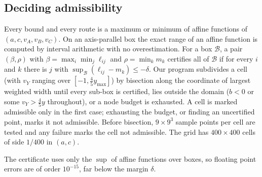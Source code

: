 \documentclass[11pt]{amsart}
\theoremstyle{definition}
\theoremstyle{remark}
\begin{document}
\subsection*{Deciding admissibility}
Every bound and every route is a maximum or minimum of affine functions of $(a,c,v_A,v_B,v_C)$. On an axis-parallel box the exact range of an affine function is computed by interval arithmetic with no overestimation. For a box $\mathcal B$, a pair $(\beta,\rho)$ with $\beta=\max_i\min_j \ell_{ij}$ and $\rho=\min_k m_k$ certifies all of $\mathcal B$ if for every $i$ and $k$ there is $j$ with $\sup_{\mathcal B}(\ell_{ij}-m_k)\le-\delta$. Our program subdivides a cell (with $v_Y$ ranging over $[-1,\frac45 y_{\max}]$) by bisection along the coordinate of largest weighted width until every sub-box is certified, lies outside the domain ($b<0$ or some $v_Y>\frac45y$ throughout), or a node budget is exhausted. A cell is marked admissible only in the first case; exhausting the budget, or finding an uncertified point, marks it not admissible. Before bisection, $9\times 9^3$ sample points per cell are tested and any failure marks the cell not admissible. The grid has $400\times400$ cells of side $1/400$ in $(a,c)$.

The certificate uses only the $\sup$ of affine functions over boxes, so floating point errors are of order $10^{-15}$, far below the margin $\delta$.
\end{document}
